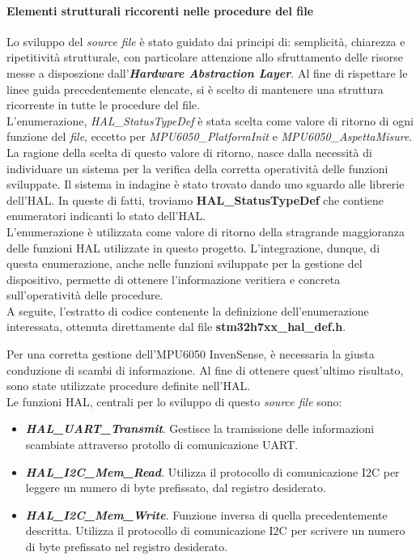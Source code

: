 \documentclass[11pt]{report}
\begin{document}
\paragraph{Elementi strutturali riccorenti nelle procedure del file}
Lo sviluppo del \textit{source file} è stato guidato dai principi di: semplicità, chiarezza e ripetitività strutturale, con particolare attenzione allo sfruttamento delle risorse messe a disposzione dall'\textbf{\textit{Hardware Abstraction Layer}}.
Al fine di rispettare le linee guida precedentemente elencate, si è scelto di mantenere una struttura ricorrente in tutte le procedure del file.\\
L'enumerazione, \textit{HAL\_StatusTypeDef} è stata scelta come valore di ritorno di ogni funzione del \textit{file}, eccetto per \textit{MPU6050\_PlatformInit} e \textit{MPU6050\_AspettaMisure}.
La ragione della scelta di questo valore di ritorno, nasce dalla necessità di individuare un sistema per la verifica della corretta operatività delle funzioni sviluppate. Il sistema in indagine è stato trovato dando uno sguardo alle librerie dell'HAL.
In queste di fatti, troviamo \textbf{HAL\_StatusTypeDef} che contiene enumeratori indicanti lo stato dell'HAL.\\
L'enumerazione è utilizzata come valore di ritorno della stragrande maggioranza delle funzioni HAL utilizzate in questo progetto. L'integrazione, dunque, di questa enumerazione, anche nelle funzioni sviluppate per la gestione del dispositivo, permette di ottenere 
l'informazione veritiera e concreta sull'operatività delle procedure.\\
A seguite, l'estratto di codice contenente la definizione dell'enumerazione interessata, ottenuta direttamente dal file \textbf{stm32h7xx\_hal\_def.h}.
\newpage

Per una corretta gestione dell'MPU6050 InvenSense, è necessaria la giusta conduzione di scambi di informazione. Al fine di ottenere quest'ultimo risultato, sono state utilizzate procedure definite nell'HAL.\\
Le funzioni HAL, centrali per lo sviluppo di questo \textit{source file} sono:
\begin{itemize}
\item \textbf{\textit{HAL\_UART\_Transmit}}. Gestisce la tramissione delle informazioni scambiate attraverso protollo di comunicazione UART.
\item \textbf{\textit{HAL\_I2C\_Mem\_Read}}. Utilizza il protocollo di comunicazione I2C per leggere un numero di byte prefissato, dal registro desiderato.
\item \textbf{\textit{HAL\_I2C\_Mem\_Write}}. Funzione inversa di quella precedentemente descritta. Utilizza il protocollo di comunicazione I2C per scrivere un numero di byte prefissato nel registro desiderato.
\end{itemize}
\end{document}
